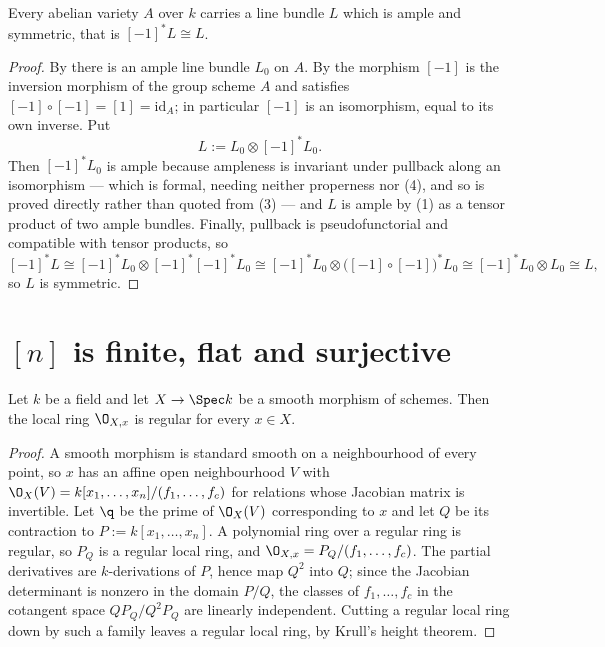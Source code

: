 \begin{proposition}
\label{prop:deg-symmetric-ample}
Every abelian variety $A$ over $k$ carries a line bundle $L$ which is ample and
symmetric, that is $[-1]^*L\cong L$.
\end{proposition}
\begin{proof}
By  there is an ample line bundle $L_0$ on
$A$.  By  the morphism $[-1]$ is the inversion
morphism of the group scheme $A$ and satisfies $[-1]\circ[-1]=[1]=\mathrm{id}_A$;
in particular $[-1]$ is an isomorphism, equal to its own inverse.  Put
\[
  L:=L_0\otimes[-1]^*L_0 .
\]
Then $[-1]^*L_0$ is ample because ampleness is invariant under pullback along an
isomorphism --- which is formal, needing neither properness nor
(4), and so is proved directly rather than quoted from
(3) --- and $L$ is ample by
(1) as a tensor product of two ample bundles.  Finally, pullback is pseudofunctorial and
compatible with tensor products, so
\[
  [-1]^*L\cong[-1]^*L_0\otimes[-1]^*[-1]^*L_0
  \cong[-1]^*L_0\otimes\bigl([-1]\circ[-1]\bigr)^*L_0
  \cong[-1]^*L_0\otimes L_0\cong L,
\]
so $L$ is symmetric.
\end{proof}

\section{$[n]$ is finite, flat and surjective}\label{sec:deg-isogeny}

\begin{lemma}
\label{lem:deg-smooth-regular}
\leanok
Let $k$ be a field and let $X\to\Spec k$ be a smooth morphism of schemes.  Then
the local ring $\O_{X,x}$ is regular for every $x\in X$.
\end{lemma}
\begin{proof}
\leanok
A smooth morphism is standard smooth on a neighbourhood of every point, so $x$
has an affine open neighbourhood $V$ with
$\O_X(V)=k[x_1,\dots,x_n]/(f_1,\dots,f_c)$ for relations whose Jacobian matrix
is invertible.  Let $\q$ be the prime of $\O_X(V)$ corresponding to $x$ and let
$Q$ be its contraction to $P:=k[x_1,\dots,x_n]$.  A polynomial ring over a
regular ring is regular, so $P_Q$ is a regular local ring, and
$\O_{X,x}=P_Q/(f_1,\dots,f_c)$.  The partial derivatives are $k$-derivations of
$P$, hence map $Q^2$ into $Q$; since the Jacobian determinant is nonzero in the
domain $P/Q$, the classes of $f_1,\dots,f_c$ in the cotangent space
$QP_Q/Q^2P_Q$ are linearly independent.  Cutting a regular local ring down by
such a family leaves a regular local ring, by Krull's height theorem.
\end{proof}

